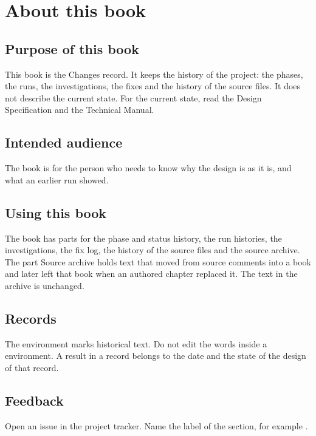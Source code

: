 \chapter*{About this book}
{}
\label{cr:ch:about}

\section*{Purpose of this book}
This book is the Changes record. It keeps the history of the project: the phases, the runs, the investigations, the fixes and the history of the source files. It does not describe the current state. For the current state, read the Design Specification and the Technical Manual.


\section*{Intended audience}
The book is for the person who needs to know why the design is as it is, and what an earlier run showed.

\section*{Using this book}
The book has parts for the phase and status history, the run histories, the investigations, the fix log, the history of the source files and the source archive. The part Source archive holds text that moved from source comments into a book and later left that book when an authored chapter replaced it. The text in the archive is unchanged.



\section*{Records}
The environment  marks historical text. Do not edit the words inside a  environment. A result in a record belongs to the date and the state of the design of that record.

\section*{Feedback}
Open an issue in the project tracker. Name the label of the section, for example .
